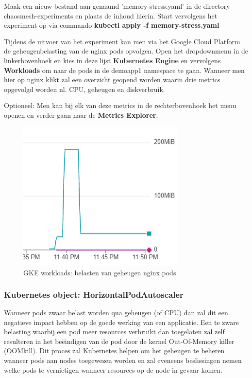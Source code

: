 Maak een nieuw bestand aan genaamd 'memory-stress.yaml' in de directory chaosmesh-experiments en plaats de inhoud hierin. Start vervolgens het experiment op via commando {\bf kubectl apply -f memory-stress.yaml}

Tijdens de uitvoer van het experiment kan men via het Google Cloud Platform de geheugenbelasting van de nginx pods opvolgen. Open het dropdownmenu in de linkerbovenhoek en kies in deze lijst {\bf Kubernetes Engine} en vervolgens {\bf Workloads} om naar de pods in de demoapp1 namespace te gaan. Wanneer men hier op nginx klikt zal een overzicht geopend worden waarin drie metrics opgevolgd worden nl. CPU, geheugen en diskverbruik.

Optioneel: Men kan bij elk van deze metrics in de rechterbovenhoek het menu openen en verder gaan naar de {\bf Metrics Explorer}.

\begin{figure}[h]
    \centering
    \includegraphics{img/nginx-memorystress.png}
    \caption{GKE workloads: belasten van geheugen nginx pods}
\end{figure}

\subsubsection{Kubernetes object: HorizontalPodAutoscaler}
\label{subsec: HPA}
Wanneer pods zwaar belast worden qua geheugen (of CPU) dan zal dit een negatieve impact hebben op de goede werking van een applicatie. Een te zware belasting waarbij een pod meer resources verbruikt dan toegelaten zal zelf resulteren in het beëindigen van de pod door de kernel Out-Of-Memory killer (OOMkill). Dit proces zal Kubernetes helpen om het geheugen te beheren wanneer pods aan nodes toegewezen worden en zal eveneens beslissingen nemen welke pods te vernietigen wanneer resources op de node in gevaar komen. \autocite{Alletto2021} 

